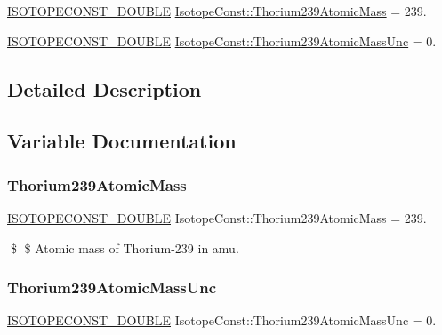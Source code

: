 \begin{DoxyCompactItemize}
\item 
\mbox{\hyperlink{group___isotope_const-_macros_ga8f45a7272ce02c0b4c65c44636ed719a}{I\+S\+O\+T\+O\+P\+E\+C\+O\+N\+S\+T\+\_\+\+D\+O\+U\+B\+LE}} \mbox{\hyperlink{group___isotope_const-_thorium-_th239_gaa5fa0d088a035f0516e35e87db440224}{Isotope\+Const\+::\+Thorium239\+Atomic\+Mass}} = 239.
\item 
\mbox{\hyperlink{group___isotope_const-_macros_ga8f45a7272ce02c0b4c65c44636ed719a}{I\+S\+O\+T\+O\+P\+E\+C\+O\+N\+S\+T\+\_\+\+D\+O\+U\+B\+LE}} \mbox{\hyperlink{group___isotope_const-_thorium-_th239_ga0c2973800b5ce81459ac00a45ea60d5d}{Isotope\+Const\+::\+Thorium239\+Atomic\+Mass\+Unc}} = 0.
\end{DoxyCompactItemize}


\subsection{Detailed Description}


\subsection{Variable Documentation}
\mbox{\label{group___isotope_const-_thorium-_th239_gaa5fa0d088a035f0516e35e87db440224}} 
\subsubsection{\texorpdfstring{Thorium239\+Atomic\+Mass}{Thorium239AtomicMass}}
{\footnotesize\ttfamily \mbox{\hyperlink{group___isotope_const-_macros_ga8f45a7272ce02c0b4c65c44636ed719a}{I\+S\+O\+T\+O\+P\+E\+C\+O\+N\+S\+T\+\_\+\+D\+O\+U\+B\+LE}} Isotope\+Const\+::\+Thorium239\+Atomic\+Mass = 239.}

\$ \$ Atomic mass of Thorium-\/239 in amu. \mbox{\label{group___isotope_const-_thorium-_th239_ga0c2973800b5ce81459ac00a45ea60d5d}} 
\subsubsection{\texorpdfstring{Thorium239\+Atomic\+Mass\+Unc}{Thorium239AtomicMassUnc}}
{\footnotesize\ttfamily \mbox{\hyperlink{group___isotope_const-_macros_ga8f45a7272ce02c0b4c65c44636ed719a}{I\+S\+O\+T\+O\+P\+E\+C\+O\+N\+S\+T\+\_\+\+D\+O\+U\+B\+LE}} Isotope\+Const\+::\+Thorium239\+Atomic\+Mass\+Unc = 0.}

